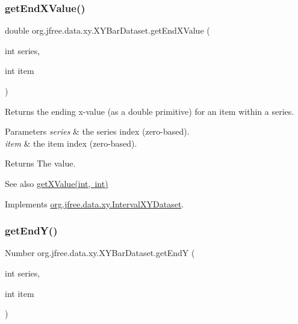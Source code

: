 \subsubsection{\texorpdfstring{get\+End\+X\+Value()}{getEndXValue()}}
{\footnotesize\ttfamily double org.\+jfree.\+data.\+xy.\+X\+Y\+Bar\+Dataset.\+get\+End\+X\+Value (\begin{DoxyParamCaption}\item[{int}]{series,  }\item[{int}]{item }\end{DoxyParamCaption})}

Returns the ending x-\/value (as a double primitive) for an item within a series.


\begin{DoxyParams}{Parameters}
{\em series} & the series index (zero-\/based). \\
\hline
{\em item} & the item index (zero-\/based).\\
\hline
\end{DoxyParams}
\begin{DoxyReturn}{Returns}
The value.
\end{DoxyReturn}
\begin{DoxySeeAlso}{See also}
\mbox{\hyperlink{classorg_1_1jfree_1_1data_1_1xy_1_1_x_y_bar_dataset_a84dba23fe8e4a19faff04e32a4bc0ea3}{get\+X\+Value(int, int)}} 
\end{DoxySeeAlso}


Implements \mbox{\hyperlink{interfaceorg_1_1jfree_1_1data_1_1xy_1_1_interval_x_y_dataset_ad976e66caa1fc4d72a599f2c26c55dcc}{org.\+jfree.\+data.\+xy.\+Interval\+X\+Y\+Dataset}}.

\mbox{\label{classorg_1_1jfree_1_1data_1_1xy_1_1_x_y_bar_dataset_a35b633397a23d1e009bca8b35fb3d4d8}} 
\subsubsection{\texorpdfstring{get\+End\+Y()}{getEndY()}}
{\footnotesize\ttfamily Number org.\+jfree.\+data.\+xy.\+X\+Y\+Bar\+Dataset.\+get\+EndY (\begin{DoxyParamCaption}\item[{int}]{series,  }\item[{int}]{item }\end{DoxyParamCaption})}

